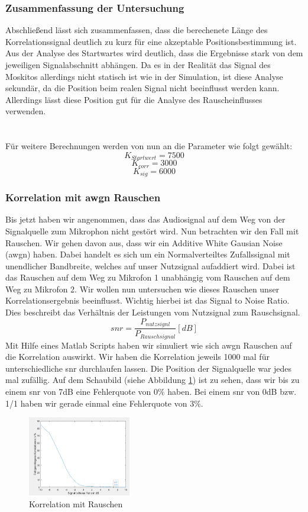 \subsubsection{Zusammenfassung der Untersuchung }
Abschließend lässt sich zusammenfassen, dass die berechenete Länge des Korrelationssignal deutlich zu kurz für eine akzeptable Positionsbestimmung ist. Aus der Analyse des Startwartes wird deutlich, dass die Ergebnisse stark von dem jeweiligen Signalabschnitt abhängen. Da es in der Realität das Signal des Moskitos allerdings nicht statisch ist wie in der Simulation, ist diese Analyse sekundär, da die Position beim realen Signal nicht beeinflusst werden kann. Allerdings lässt diese Position gut für die Analyse des Rauscheinflusses verwenden. \\\\\\
Für weitere Berechnungen werden von nun an die Parameter wie folgt gewählt:\\
$$K_{Startwert} = 7500$$
$$K_{corr} = 3000$$
$$K_{sig} = 6000$$

\subsubsection{Korrelation mit awgn Rauschen }
Bis jetzt haben wir angenommen, dass das Audiosignal auf dem Weg von der Signalquelle zum Mikrophon nicht gestört wird. Nun betrachten wir den Fall mit Rauschen. Wir gehen davon aus, dass wir ein Additive White Gausian Noise (awgn) haben. Dabei handelt es sich um ein Normalverteiltes Zufallssignal mit unendlicher Bandbreite, welches auf unser Nutzsignal aufaddiert wird. Dabei ist das Rauschen auf dem Weg zu Mikrofon 1 unabhängig vom Rauschen auf dem Weg zu Mikrofon 2. Wir wollen nun untersuchen wie dieses Rauschen unser Korrelationsergebnis beeinflusst. Wichtig hierbei ist das Signal to Noise Ratio. Dies beschreibt das Verhältnis der Leistungen vom Nutzsignal zum Rauschsignal. 
$$ snr = \frac{P_{nutzsignl}}{P_{Rauschsignal}} [dB]$$
Mit Hilfe eines Matlab Scripts haben wir simuliert wie sich awgn Rauschen auf die Korrelation auswirkt. Wir haben die Korrelation jeweils 1000 mal für unterschiedliche snr durchlaufen lassen. Die Position der Signalquelle war jedes mal zufällig. Auf dem Schaubild (siehe Abbildung \ref{fig:KorrelationAnalyseMitRauschen}) ist zu sehen, dass wir bis zu einem snr von 7dB eine Fehlerquote von 0\% haben. Bei einem snr von 0dB bzw. 1/1 haben wir gerade einmal eine Fehlerquote von 3\%.


\begin{figure}
\centering 
\includegraphics[width=0.4\textwidth]{Correlation mit Rauschen, (SNR) bei 4000 Segmentlaenge und 7500 corrBegin (in dB)}
\caption{Korrelation mit Rauschen} \label{fig:KorrelationAnalyseMitRauschen}
\end{figure}